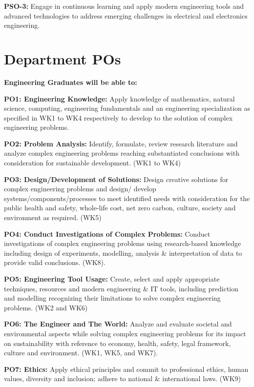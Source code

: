 \begin{titlepage}
	\noindent \textbf{PSO-3:} Engage in continuous learning and apply modern engineering tools and advanced technologies to address emerging challenges in electrical and electronics engineering.
	
	\section*{\centering Department POs}
	
	\textbf{Engineering Graduates will be able to:}
	
	\noindent \textbf{PO1: Engineering Knowledge:} Apply knowledge of mathematics, natural science, computing, engineering fundamentals and an engineering specialization as specified in WK1 to WK4
	respectively to develop to the solution of complex engineering problems.
	
	\noindent \textbf{PO2: Problem Analysis:} Identify, formulate, review research literature and analyze complex 	engineering problems reaching substantiated conclusions with consideration for
	sustainable development. (WK1 to WK4)
	
	\noindent \textbf{PO3: Design/Development of Solutions:} Design creative solutions for complex engineering problems and design/ develop systems/components/processes to meet identified needs with consideration for the public health and safety, whole-life cost, net zero carbon, culture, society and environment as required. (WK5)
	
	\noindent \textbf{PO4: Conduct Investigations of Complex Problems:} Conduct investigations of complex 	engineering problems using research-based knowledge including design of experiments, modelling, analysis \& interpretation of data to provide valid conclusions. (WK8).
	
	\noindent \textbf{PO5: Engineering Tool Usage:} Create, select and apply appropriate techniques, resources and modern engineering \& IT tools, including prediction and modelling recognizing their limitations to solve complex engineering problems. (WK2 and WK6)
	
	\noindent \textbf{PO6: The Engineer and The World:} Analyze and evaluate societal and environmental aspects
	while solving complex engineering problems for its impact on sustainability with reference to economy, health, safety, legal framework, culture and environment. (WK1,
	WK5, and WK7).
	
	\noindent \textbf{PO7: Ethics:} Apply ethical principles and commit to professional ethics, human values,
	diversity and inclusion; adhere to national \& international laws. (WK9)
	

\end{titlepage}
